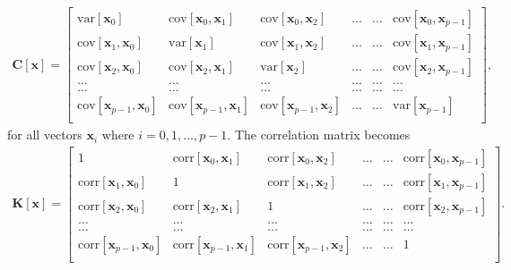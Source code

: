 \begin{align}
  \boldsymbol{C}[\boldsymbol{x}] = \begin{bmatrix}
\mathrm{var}[\boldsymbol{x}_0] & \mathrm{cov}[\boldsymbol{x}_0,\boldsymbol{x}_1]  & \mathrm{cov}[\boldsymbol{x}_0,\boldsymbol{x}_2] & \dots & \dots & \mathrm{cov}[\boldsymbol{x}_0,\boldsymbol{x}_{p-1}]\\
\mathrm{cov}[\boldsymbol{x}_1,\boldsymbol{x}_0] & \mathrm{var}[\boldsymbol{x}_1]  & \mathrm{cov}[\boldsymbol{x}_1,\boldsymbol{x}_2] & \dots & \dots & \mathrm{cov}[\boldsymbol{x}_1,\boldsymbol{x}_{p-1}]\\
\mathrm{cov}[\boldsymbol{x}_2,\boldsymbol{x}_0]   & \mathrm{cov}[\boldsymbol{x}_2,\boldsymbol{x}_1] & \mathrm{var}[\boldsymbol{x}_2] & \dots & \dots & \mathrm{cov}[\boldsymbol{x}_2,\boldsymbol{x}_{p-1}]\\
\dots & \dots & \dots & \dots & \dots & \dots \\
\dots & \dots & \dots & \dots & \dots & \dots \\
\mathrm{cov}[\boldsymbol{x}_{p-1},\boldsymbol{x}_0]   & \mathrm{cov}[\boldsymbol{x}_{p-1},\boldsymbol{x}_1] & \mathrm{cov}[\boldsymbol{x}_{p-1},\boldsymbol{x}_{2}]  & \dots & \dots  & \mathrm{var}[\boldsymbol{x}_{p-1}]\\
\end{bmatrix},
\end{align}
for all vectors $\boldsymbol{x}_i$ where $i=0,1,\dots,p-1$. The correlation matrix becomes
\begin{align}
  \boldsymbol{K}[\boldsymbol{x}] = \begin{bmatrix}
  1 & \mathrm{corr}[\boldsymbol{x}_0,\boldsymbol{x}_1]  & \mathrm{corr}[\boldsymbol{x}_0,\boldsymbol{x}_2] & \dots & \dots & \mathrm{corr}[\boldsymbol{x}_0,\boldsymbol{x}_{p-1}]\\
  \mathrm{corr}[\boldsymbol{x}_1,\boldsymbol{x}_0] & 1  & \mathrm{corr}[\boldsymbol{x}_1,\boldsymbol{x}_2] & \dots & \dots & \mathrm{corr}[\boldsymbol{x}_1,\boldsymbol{x}_{p-1}]\\
  \mathrm{corr}[\boldsymbol{x}_2,\boldsymbol{x}_0]   & \mathrm{corr}[\boldsymbol{x}_2,\boldsymbol{x}_1] & 1 & \dots & \dots & \mathrm{corr}[\boldsymbol{x}_2,\boldsymbol{x}_{p-1}]\\
  \dots & \dots & \dots & \dots & \dots & \dots \\
  \dots & \dots & \dots & \dots & \dots & \dots \\
  \mathrm{corr}[\boldsymbol{x}_{p-1},\boldsymbol{x}_0]   & \mathrm{corr}[\boldsymbol{x}_{p-1},\boldsymbol{x}_1] & \mathrm{corr}[\boldsymbol{x}_{p-1},\boldsymbol{x}_{2}]  & \dots & \dots  & 1\\
  \end{bmatrix}.
\end{align}

